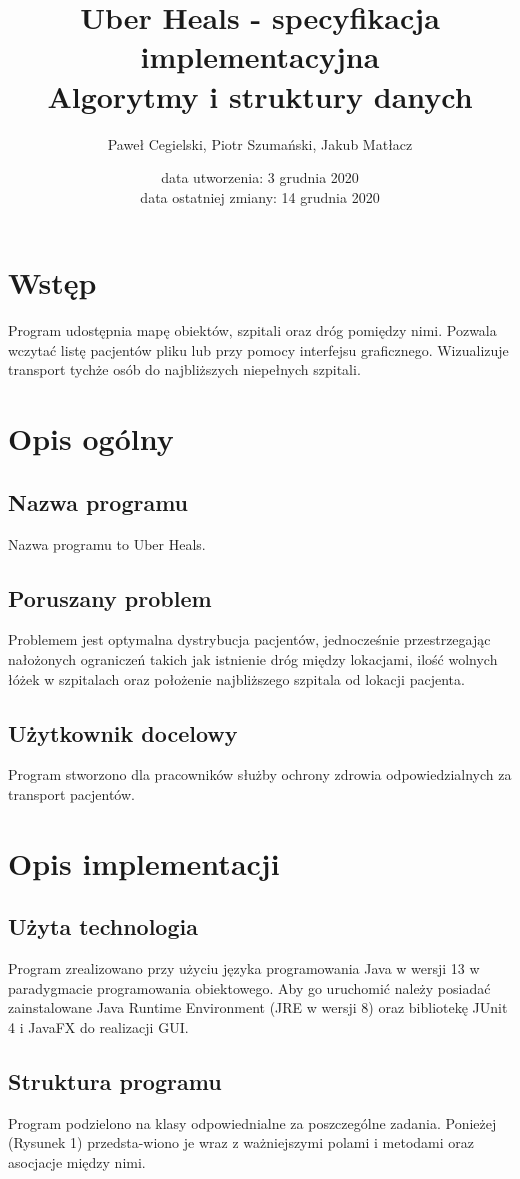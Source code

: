 \documentclass[11pt, a4paper]{article}
\title{\textbf{Uber Heals - specyfikacja implementacyjna}\\
    Algorytmy i struktury danych}
\author{Paweł Cegielski, Piotr Szumański, Jakub Matłacz}
\date{data utworzenia: 3 grudnia 2020\\
    data ostatniej zmiany: 14 grudnia 2020}
\begin{document}
\maketitle

\section{Wstęp}
Program udostępnia mapę obiektów, szpitali oraz dróg pomiędzy nimi. Pozwala wczytać listę pacjentów pliku lub przy pomocy interfejsu graficznego. Wizualizuje transport tychże osób do najbliższych niepełnych szpitali.

\section{Opis ogólny}
    \subsection{Nazwa programu}
    Nazwa programu to Uber Heals.
    \subsection{Poruszany problem}
    Problemem jest optymalna dystrybucja pacjentów, jednocześnie przestrzegając nałożonych ograniczeń takich jak istnienie dróg między lokacjami, ilość wolnych łóżek w szpitalach oraz położenie najbliższego szpitala od lokacji pacjenta.
    \subsection{Użytkownik docelowy}
    Program stworzono dla pracowników służby ochrony zdrowia odpowiedzialnych za transport pacjentów.
    
\section{Opis implementacji}
    \subsection{Użyta technologia}
 Program zrealizowano przy użyciu języka programowania Java w wersji 13 w paradygmacie programowania obiektowego. Aby go uruchomić należy posiadać zainstalowane Java Runtime Environment (JRE w wersji 8) oraz bibliotekę JUnit 4 i JavaFX do realizacji GUI.
 
 \subsection{Struktura programu}
Program podzielono na klasy odpowiednialne za poszczególne zadania. Ponieżej (Rysunek 1) przedsta-wiono je wraz z ważniejszymi polami i metodami oraz asocjacje między nimi.
\end{document}
